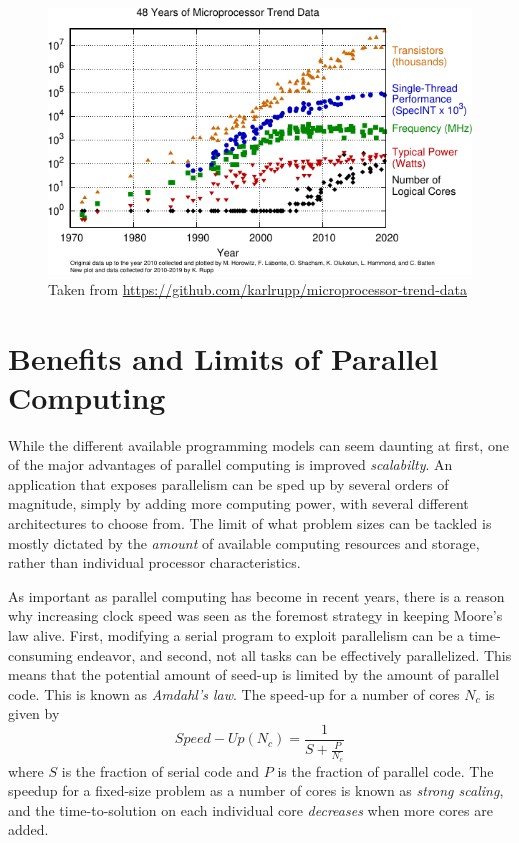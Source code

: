 \begin{figure}
\centering
\includegraphics[scale=1.2]{Pics/moore}
\caption[Moore's Law]{Taken from \protect\url{https://github.com/karlrupp/microprocessor-trend-data}}
\label{fig:MOORE}
\end{figure}

\section{Benefits and Limits of Parallel Computing}

While the different available programming models can seem daunting at first, one of the major advantages of parallel computing is improved \emph{scalabilty}. An application that exposes parallelism can be sped up by several orders of magnitude, simply by adding more computing power, with several different architectures to choose from. The limit of what problem sizes can be tackled is mostly dictated by the \emph{amount} of available computing resources and storage, rather than individual processor characteristics.

As important as parallel computing has become in recent years, there is a reason why increasing clock speed was seen as the foremost strategy in keeping Moore's law alive. First, modifying a serial program to exploit parallelism can be a time-consuming endeavor, and second, not all tasks can be effectively parallelized. This means that the potential amount of seed-up is limited by the amount of parallel code. This is known as \emph{Amdahl's law}. The speed-up for a number of cores $N_c$ is given by
\begin{equation}
Speed-Up(N_c) = \frac{1}{S + \frac{P}{N_c}}
\end{equation}
\noindent where $S$ is the fraction of serial code and $P$ is the fraction of parallel code. The speedup for a fixed-size problem as a number of cores is known as \emph{strong scaling}, and the time-to-solution on each individual core \emph{decreases} when more cores are added.

